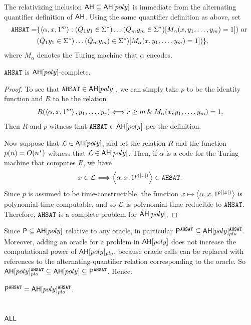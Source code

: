 The relativizing inclusion $\mathsf{AH}\subseteq\mathsf{AH}[poly]$ is immediate from
the alternating quantifier definition of $\mathsf{AH}$. Using the same quantifier definition as above, set
\begin{align*}
\mathtt{AHSAT}=&\{\left\langle\alpha,x,1^m\right\rangle:
(Q_1y_1\in\Sigma^*)\ldots(Q_my_m\in\Sigma^*)[M_\alpha(x,y_1,\ldots,y_m)=1])
\text{ or }\\
&(\bar Q_1y_1\in\Sigma^*)\ldots(\bar Q_my_m)\in\Sigma^*)
[M_\alpha(x,y_1,\ldots,y_m)=1])\},
\end{align*}
where $M_\alpha$ denotes the Turing machine that $\alpha$ encodes.
\begin{proposition}
$\mathtt{AHSAT}$ is $\mathsf{AH}[poly]$-complete.
\end{proposition}
\begin{proof}
To see that $\mathtt{AHSAT}\in\mathsf{AH}[poly]$, we can simply take $p$ to be the
identity function and $R$ to be the relation
\[
R(\left\langle\alpha,x,1^m\right\rangle,y_1,\ldots,y_r)\Longleftrightarrow
r\geq m\mathbin{\&} M_\alpha(x,y_1,\ldots,y_m)=1.
\]
Then $R$ and $p$ witness that $\mathtt{AHSAT}\in\mathsf{AH}[poly]$ per the
definition.

Now suppose that $\mathcal{L}\in\mathsf{AH}[poly]$, and let the relation $R$ and the
function $p(n)=O(n^*)$ witness that $\mathcal{L}\in\mathsf{AH}[poly]$. Then, if $\alpha$ is
a code for the Turing machine that computes $R$, we have
\[
x\in\mathcal{L}\Longleftrightarrow\left\langle\alpha,x,1^{p(|x|)}\right\rangle\in\mathtt{AHSAT}.
\]
Since $p$ is assumed to be time-constructible, the function
$x\mapsto\left\langle\alpha,x,1^{p(|x|)}\right\rangle$ is polynomial-time computable, and so
$\mathcal{L}$ is polynomial-time reducible to $\mathtt{AHSAT}$. Therefore,
$\mathtt{AHSAT}$ is a complete problem for $\mathsf{AH}[poly]$.
\end{proof}
Since $\mathsf{P}\subseteq\mathsf{AH}[poly]$ relative to any oracle, in particular
$\mathsf{P}^{\mathtt{AHSAT}}\subseteq\mathsf{AH}[poly]_{plo}^{\mathtt{AHSAT}}$. Moreover, 
adding an oracle for a problem in $\mathsf{AH}[poly]$ does not
increase the computational power of $\mathsf{AH}[poly]_{plo}$, because oracle calls
can be replaced with references to the alternating-quantifier relation 
corresponding to the oracle. So
$\mathsf{AH}[poly]_{plo}^{\mathtt{AHSAT}}\subseteq\mathsf{AH}[poly]\subseteq
\mathsf{P}^{\mathtt{AHSAT}}$. Hence:
\begin{theorem}[Kuperberg]
$\mathsf{P}^{\mathtt{AHSAT}}=\mathsf{AH}[poly]_{plo}^{\mathtt{AHSAT}}$.
\end{theorem}

\subsection{$\mathsf{ALL}$}

